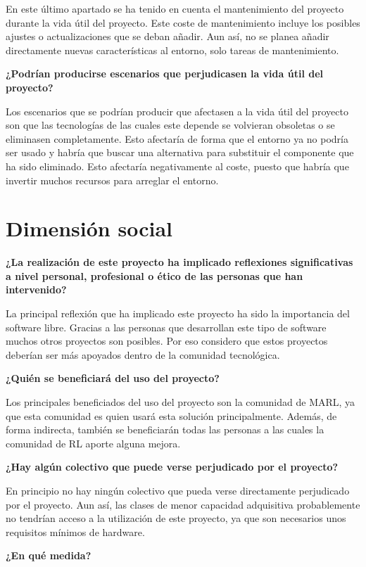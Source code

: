 En este último apartado se ha tenido en cuenta el mantenimiento del proyecto durante la vida útil del proyecto. Este coste de mantenimiento incluye los posibles ajustes o actualizaciones que se deban añadir. Aun así, no se planea añadir directamente nuevas características al entorno, solo tareas de mantenimiento.

\textbf{¿Podrían producirse escenarios que perjudicasen la vida útil del proyecto?}

Los escenarios que se podrían producir que afectasen a la vida útil del proyecto son que las tecnologías de las cuales este depende se volvieran obsoletas o se eliminasen completamente. Esto afectaría de forma que el entorno ya no podría ser usado y habría que buscar una alternativa para substituir el componente que ha sido eliminado. Esto afectaría negativamente al coste, puesto que habría que invertir muchos recursos para arreglar el entorno.

\section{Dimensión social}

\textbf{¿La realización de este proyecto ha implicado reflexiones significativas a nivel personal, profesional o ético de las personas que han intervenido?}

La principal reflexión que ha implicado este proyecto ha sido la importancia del software libre. Gracias a las personas que desarrollan este tipo de software muchos otros proyectos son posibles. Por eso considero que estos proyectos deberían ser más apoyados dentro de la comunidad tecnológica.

\textbf{¿Quién se beneficiará del uso del proyecto?}

Los principales beneficiados del uso del proyecto son la comunidad de MARL, ya que esta comunidad es quien usará esta solución principalmente. Además, de forma indirecta, también se beneficiarán todas las personas a las cuales la comunidad de RL aporte alguna mejora.

\textbf{¿Hay algún colectivo que puede verse perjudicado por el proyecto?}

En principio no hay ningún colectivo que pueda verse directamente perjudicado por el proyecto. Aun así, las clases de menor capacidad adquisitiva probablemente no tendrían acceso a la utilización de este proyecto, ya que son necesarios unos requisitos mínimos de hardware.

\textbf{¿En qué medida?}

